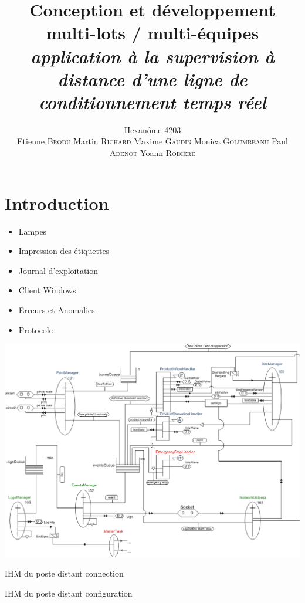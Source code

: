 \documentclass{beamer}
\title{Conception et développement multi-lots /  multi-équipes\\ \emph{application à la supervision à distance d'une ligne de conditionnement temps réel}}
\author{Hexanôme 4203\\Etienne \textsc{Brodu} Martin \textsc{Richard} Maxime \textsc{Gaudin} Monica \textsc{Golumbeanu} Paul \textsc{Adenot} Yoann \textsc{Rodière}}
\begin{document}
	\begin{frame}
		\titlepage
	\end{frame}

\section{Introduction}
	\begin{frame}
		\begin{itemize}	
			\item Lampes
			\item Impression des étiquettes %
			\item Journal d'exploitation
			\item Client Windows
			\item Erreurs et Anomalies
			\item Protocole
		\end{itemize}
	\end{frame}

	\begin{frame}
		\includegraphics[width=\textwidth]{../../SchemasLCG/schemaGlobal.png}
	\end{frame}

	\begin{frame}
		IHM du poste distant
		connection
	\end{frame}

	\begin{frame}
		IHM du poste distant
		configuration
	\end{frame}
\end{document}
